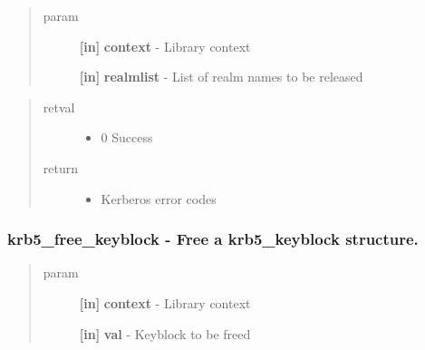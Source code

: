 \documentclass[letterpaper,10pt,english]{sphinxmanual}
\begin{document}
\begin{quote}\begin{description}
\item[{param}] \leavevmode
\textbf{{[}in{]}} \textbf{context} - Library context

\textbf{{[}in{]}} \textbf{realmlist} - List of realm names to be released

\end{description}\end{quote}
\begin{quote}\begin{description}
\item[{retval}] \leavevmode\begin{itemize}
\item {} 
0   Success

\end{itemize}

\item[{return}] \leavevmode\begin{itemize}
\item {} 
Kerberos error codes

\end{itemize}

\end{description}\end{quote}


\subsubsection{krb5\_free\_keyblock -  Free a krb5\_keyblock structure.}
\label{appdev/refs/api/krb5_free_keyblock:krb5-free-keyblock-free-a-krb5-keyblock-structure}\label{appdev/refs/api/krb5_free_keyblock::doc}

\begin{fulllineitems}
\label{appdev/refs/api/krb5_free_keyblock:krb5_free_keyblock}
\end{fulllineitems}

\begin{quote}\begin{description}
\item[{param}] \leavevmode
\textbf{{[}in{]}} \textbf{context} - Library context

\textbf{{[}in{]}} \textbf{val} - Keyblock to be freed

\end{description}\end{quote}
\end{document}
